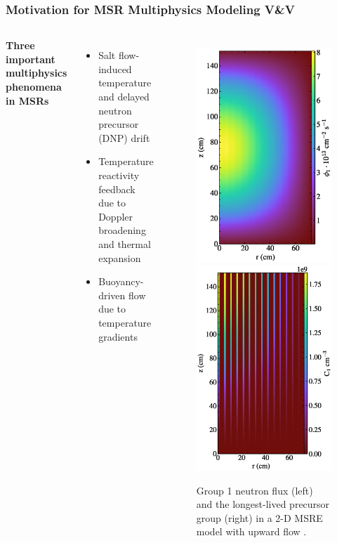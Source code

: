 \begin{frame}
  \frametitle{Motivation for MSR Multiphysics Modeling V\&V}
  \begin{columns}
    \column{5.5cm}
      \textbf{Three important multiphysics phenomena in MSRs}
      \begin{itemize}
        \item Salt flow-induced temperature and delayed neutron precursor (DNP) drift
        \item Temperature reactivity feedback due to Doppler broadening and thermal expansion
        \item Buoyancy-driven flow due to temperature gradients
      \end{itemize}
    \column{5.5cm}
      \begin{figure}
        \centering
        \includegraphics[width=.48\columnwidth]{../images/2d_gamma_heating_group1}
        \includegraphics[width=.48\columnwidth]{images/2d_gamma_heating_pre1_scaled}
        \caption{Group 1 neutron flux (left) and the longest-lived precursor group (right) in a 2-D
        MSRE model with upward flow \cite{lindsay_introduction_2018}.}
      \end{figure}
  \end{columns}
\end{frame}

